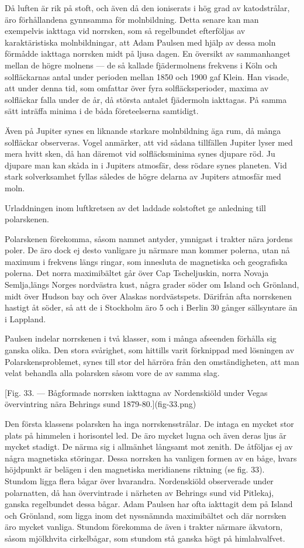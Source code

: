 \documentclass[a4paper, 12pt, oneside, swedish]{article}
\begin{document}
Då luften är rik på stoft, och även då den ioniserats i hög grad av katodstrålar, äro förhållandena gynnsamma för molnbildning. Detta senare kan man exempelvis iakttaga vid norrsken, som så regelbundet efterföljas av karaktäristiska molnbildningar, att Adam Paulsen med hjälp av dessa moln förmådde iakttaga norrsken midt på ljusa dagen. En översikt av sammanhanget mellan de högre molnens --- de så kallade fjädermolnens frekvens i Köln och solfläckarnas antal under perioden mellan 1850 och 1900 gaf Klein. Han visade, att under denna tid, som omfattar över fyra solfläcksperioder, maxima av solfläckar falla under de år, då största antalet fjädermoln iakttagas. På samma sätt inträffa minima i de båda företeelserna samtidigt.

Även på Jupiter synes en liknande starkare molnbildning äga rum, då många solfläckar observeras. Vogel anmärker, att vid sådana tillfällen Jupiter lyser med mera hvitt sken, då han däremot vid solfläcksminima synes djupare röd. Ju djupare man kan skåda in i Jupiters atmosfär, dess rödare synes planeten. Vid stark solverksamhet fyllas således de högre delarna av Jupiters atmosfär med moln.

Urladdningen inom luftkretsen av det laddade solstoftet ge anledning till polarskenen.

Polarskenen förekomma, såsom namnet antyder, ymnigast i trakter nära jordens poler. De äro dock ej desto vanligare ju närmare man kommer polerna, utan nå maximum i frekvens längs ringar, som innesluta de magnetiska och geografiska polerna. Det norra maximibältet går över Cap Tscheljuskin, norra Novaja Semlja,längs Norges nordvästra kust, några grader söder om Island och Grönland, midt över Hudson bay och över Alaskas nordvästspets. Därifrån afta norrskenen hastigt åt söder, så att de i Stockholm äro 5 och i Berlin 30 gånger sällsyntare än i Lappland.

Paulsen indelar norrskenen i två klasser, som i många afseenden förhålla sig ganska olika. Den stora svårighet, som hittills varit förknippad med lösningen av Polarskensproblemet, synes till stor del härröra från den omständigheten, att man velat behandla alla polarsken såsom vore de av samma slag.

[Fig. 33. --- Bågformade norrsken iakttagna av Nordenskiöld under Vegas övervintring nära Behrings sund 1879-80.](fig-33.png)

Den första klassens polarsken ha inga norrskensstrålar. De intaga en mycket stor plats på himmelen i horisontel led. De äro mycket lugna och även deras ljus är mycket stadigt. De närma sig i allmänhet långsamt mot zenith. De åtföljas ej av några magnetiska störingar. Dessa norrsken ha vanligen formen av en båge, hvars höjdpunkt är belägen i den magnetiska meridianens riktning (se fig. 33). Stundom ligga flera bågar över hvarandra. Nordenskiöld observerade under polarnatten, då han övervintrade i närheten av Behrings sund vid Pitlekaj, ganska regelbundet dessa bågar. Adam Paulsen har ofta iakttagit dem på Island och Grönland, som ligga inom det nyssnämnda maximibältet och där norrsken äro mycket vanliga. Stundom förekomma de även i trakter närmare äkvatorn, såsom mjölkhvita cirkelbågar, som stundom stå ganska högt på himlahvalfvet.
\end{document}
